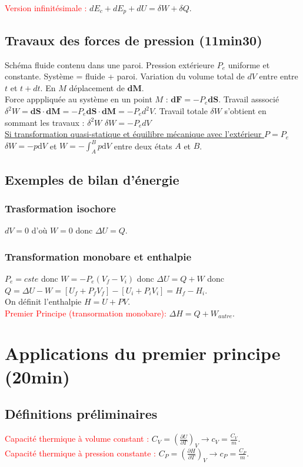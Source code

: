 \documentclass[11pt]{report}
\numberwithin{figure}{section}
\numberwithin{equation}{section}
\numberwithin{table}{section}
\newcommand{\ud}{\mathrm{d}}
\newcommand{\1}{\boldsymbol{1}}
\begin{document}
  \textcolor{red}{Version infinitésimale : } $dE_c + dE_p + dU = \delta W + \delta Q$.
  
  \subsection{Travaux des forces de pression (11min30)}
  Schéma fluide contenu dans une paroi. Pression extérieure $P_e$ uniforme et constante. Système = {fluide + paroi}. Variation du volume total de $dV$ entre entre $t$ et $t+dt$. En $M$ déplacement de $\bm{dM}$. \\
  Force apppliquée au système en un point $M$ : $\mathbf{dF}=-P_e\mathbf{dS}$. Travail asssocié $\delta^2 W = \mathbf{dS}\cdot\mathbf{dM} = -P_e \mathbf{dS}\cdot\mathbf{dM} = - P_e d^2 V$. Travail totale $\delta W$ s'obtient en sommant les travaux : $\delta^2 W$ $\delta W = -P_e dV$\\
  \underline{Si transformation quasi-statique et équilibre mécanique avec l'extérieur $P=P_e$} $\delta W = - p \ud V$ et $W = - \int_A^B p \ud V$ entre deux états $A$ et $B$.
  
 \subsection{Exemples de bilan d'énergie}
 \subsubsection{Trasformation isochore}
 $dV=0$ d'où $W=0$ donc $\Delta U = Q$.
 
 \subsubsection{Transformation monobare et enthalpie}
 $P_e=cste$ donc $W=-P_e(V_f-V_i)$ donc $\Delta U = Q + W$ donc $Q = \Delta U - W = [U_f +P_f V_f]-[U_i+P_iV_i] = H_f - H_i$.\\
 On définit l'enthalpie $H=U+PV$.\\
 
 \textcolor{red}{Premier Principe (transormation monobare):} $\Delta H = Q + W_{autre}$.
 
  \section{Applications du premier principe (20min)}
  \subsection{Définitions préliminaires}
  \textcolor{red}{Capacité thermique à volume constant : } $C_V = (\frac{\partial{U}}{\partial{T}})_V \rightarrow c_V = \frac{C_V}{m}$. \\
  \textcolor{red}{Capacité thermique à pression constante : } $C_P = (\frac{\partial{H}}{\partial{T}})_V \rightarrow c_P = \frac{C_P}{m}$. \\
  
\end{document}
